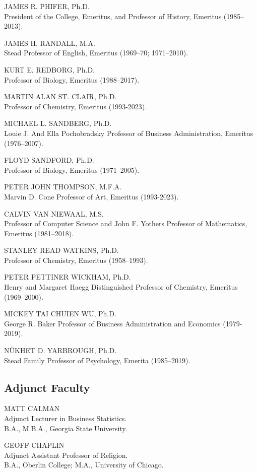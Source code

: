 \documentclass[
  letterpaper,
]{scrbook}
\begin{document}
JAMES R. PHIFER, Ph.D.\\
President of the College, Emeritus, and Professor of History, Emeritus
(1985--2013).

JAMES H. RANDALL, M.A.\\
Stead Professor of English, Emeritus (1969--70; 1971--2010).

KURT E. REDBORG, Ph.D.\\
Professor of Biology, Emeritus (1988--2017).

MARTIN ALAN ST. CLAIR, Ph.D.\\
Professor of Chemistry, Emeritus (1993-2023).

MICHAEL L. SANDBERG, Ph.D.\\
Louie J. And Ella Pochobradsky Professor of Business Administration,
Emeritus (1976--2007).

FLOYD SANDFORD, Ph.D.\\
Professor of Biology, Emeritus (1971--2005).

PETER JOHN THOMPSON, M.F.A.\\
Marvin D. Cone Professor of Art, Emeritus (1993-2023).

CALVIN VAN NIEWAAL, M.S.\\
Professor of Computer Science and John F. Yothers Professor of
Mathematics, Emeritus (1981--2018).

STANLEY READ WATKINS, Ph.D.\\
Professor of Chemistry, Emeritus (1958--1993).

PETER PETTINER WICKHAM, Ph.D.\\
Henry and Margaret Haegg Distinguished Professor of Chemistry, Emeritus
(1969--2000).

MICKEY TAI CHUIEN WU, Ph.D.\\
George R. Baker Professor of Business Administration and Economics
(1979-2019).

NŰKHET D. YARBROUGH, Ph.D.\\
Stead Family Professor of Psychology, Emerita (1985--2019).

\subsection{Adjunct Faculty}\label{adjunct-faculty}

MATT CALMAN\\
Adjunct Lecturer in Business Statistics.\\
B.A., M.B.A., Georgia State University.

GEOFF CHAPLIN\\
Adjunct Assistant Professor of Religion.\\
B.A., Oberlin College; M.A., University of Chicago.
\end{document}
